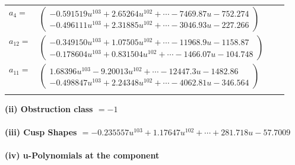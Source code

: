 \documentclass[1p]{elsarticle_modified}
\theoremstyle{definition}
\begin{document}
\begin{tabular}{m{7pt} m{180pt} m{7pt} m{180pt} }
\flushright $a_{4}=$&$\begin{pmatrix}-0.591519 u^{103}+2.65264 u^{102}+\cdots-7469.87 u-752.274\\-0.496111 u^{103}+2.31885 u^{102}+\cdots-3046.93 u-227.266\end{pmatrix}$ \\
\flushright $a_{12}=$&$\begin{pmatrix}-0.349150 u^{103}+1.07505 u^{102}+\cdots-11968.9 u-1158.87\\-0.178604 u^{103}+0.831504 u^{102}+\cdots-1466.07 u-104.748\end{pmatrix}$ \\
\flushright $a_{11}=$&$\begin{pmatrix}1.68396 u^{103}-9.20013 u^{102}+\cdots-12447.3 u-1482.86\\-0.498847 u^{103}+2.24348 u^{102}+\cdots-4062.81 u-346.564\end{pmatrix}$\\&\end{tabular}
\flushleft \textbf{(ii) Obstruction class $= -1$}\\~\\
\flushleft \textbf{(iii) Cusp Shapes $= -0.235557 u^{103}+1.17647 u^{102}+\cdots+281.718 u-57.7009$}\\~\\
\newpage\renewcommand{\arraystretch}{1}
\flushleft \textbf{(iv) u-Polynomials at the component}\newline \\
\end{document}
